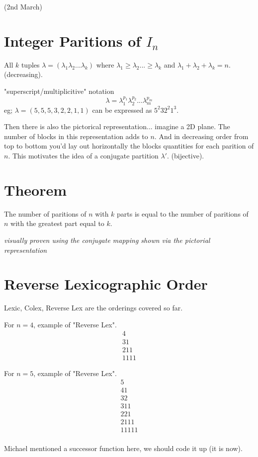 \documentclass{article}
\begin{document}
(2nd March)
\section*{Integer Paritions of $I_n$}
All $k$ tuples $\lambda = (\lambda_1 \lambda_2 ... \lambda_k)$ where $\lambda_1 \geq \lambda_2 ... \geq \lambda_k$ and $\lambda_1+\lambda_2+\lambda_k = n$. (decreasing).

"superscript/multiplicitive" notation 
\begin{equation}
\lambda = \lambda_{1}^{p_1}\lambda_{2}^{p_2}...\lambda_{m}^{p_m}
\end{equation}
eg; $\lambda=(5,5,5,3,2,2,1,1)$ can be expressed as $5^{2}32^{2}1^{3}$.

Then there is also the pictorical representation... imagine a 2D plane. The number of blocks in this representation adds to $n$. And in decreasing order from top to bottom you'd lay out horizontally the blocks quantities for each parition of $n$. This motivates the idea of a conjugate partition $\lambda'$. (bijective).

\section*{Theorem}
The number of paritions of $n$ with $k$ parts is equal to the number of paritions of $n$ with the greatest part equal to $k$.

{\em visually proven using the conjugate mapping shown via the pictorial representation}

\section*{Reverse Lexicographic Order}
Lexic, Colex, Reverse Lex are the orderings covered so far.

For $n=4$, example of "Reverse Lex".
\begin{align*}
4 \\
3 1 \\
2 1 1 \\
1 1 1 1
\end{align*}

For $n=5$, example of "Reverse Lex".
\begin{align*}
5 \\
4 1 \\
3 2 \\
3 1 1 \\
2 2 1 \\
2 1 1 1 \\
1 1 1 1 1 \\
\end{align*}

Michael mentioned a successor function here, we should code it up (it is now).
\end{document}
